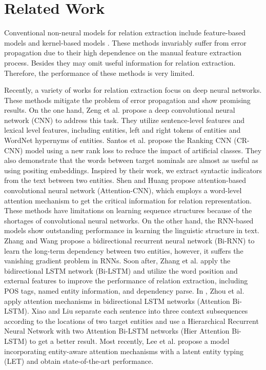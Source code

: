 \documentclass[conference]{IEEEtran}
\begin{document}
\section{Related Work}
Conventional non-neural models for relation extraction include feature-based models \cite{kambhatla2004combining}\cite{suchanek2006combining} and kernel-based models \cite{qian2008exploiting}\cite{mooney2006subsequence}. These methods invariably suffer from error propagation due to their high dependence on the manual feature extraction process. Besides they may omit useful information for relation extraction. Therefore, the performance of these methods is very limited.

Recently, a variety of works for relation extraction focus on deep neural networks. These methods mitigate the problem of error propagation and show promising results. On the one hand, Zeng et al. \cite{zeng2014relation} propose a deep convolutional neural network (CNN) to address this task. They utilize sentence-level features and lexical level features, including entities, left and right tokens of entities and WordNet hypernyms of entities. Santos et al. \cite{dos2015classifying} propose the Ranking CNN (CR-CNN) model using a new rank loss to reduce the impact of artificial classes. They also demonstrate that the words between target nominals are almost as useful as using positing embeddings. Inspired by their work, we extract syntactic indicators from the text between two entities. Shen and Huang \cite{huang2016attention} propose attention-based convolutional neural network (Attention-CNN), which employs a word-level attention mechanism to get the critical information for relation representation. These methods have limitations on learning sequence structures because of the shortages of convolutional neural networks. On the other hand, the RNN-based models show outstanding performance in learning the linguistic structure in text. Zhang and Wang \cite{zhang2015relation} propose a bidirectional recurrent neural network (Bi-RNN) to learn the long-term dependency between two entities, however, it suffers the vanishing gradient problem in RNNs. Soon after, Zhang et al. \cite{zhang2015bidirectional} apply the bidirectional LSTM network (Bi-LSTM) and utilize the word position and external features to improve the performance of relation extraction, including POS tags, named entity information, and dependency parse. In \cite{zhou2016attention}, Zhou et al. apply attention mechanisms in bidirectional LSTM networks (Attention Bi-LSTM). Xiao and Liu \cite{xiao2016semantic} separate each sentence into three context subsequences according to the locations of two target entities and use a Hierarchical Recurrent Neural Network with two Attention Bi-LSTM networks (Hier Attention Bi-LSTM) to get a better result. Most recently, Lee et al. \cite{lee2019semantic} propose a model incorporating entity-aware attention mechanisms with a latent entity typing (LET) and obtain state-of-the-art performance. 
\end{document}
